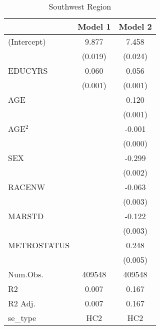 \documentclass[12pt, English]{article}
\begin{document}
\begin{table}
\centering %
    \caption{Southwest Region}
    \vspace{7.5mm} %
\begin{tabular}[t]{lcc}
\toprule
& Model 1 & Model 2\\
\midrule
(Intercept) & 9.877 & 7.458\\
 & (0.019) & (0.024)\\
EDUCYRS & 0.060 & 0.056\\
 & (0.001) & (0.001)\\
AGE &  & 0.120\\
 &  & (0.001)\\
AGE$^2$ &  & -0.001\\
 &  & (0.000)\\
SEX &  & -0.299\\
 &  & (0.002)\\
RACENW &  & -0.063\\
 &  & \vphantom{1} (0.003)\\
MARSTD &  & -0.122\\
 &  & (0.003)\\
METROSTATUS &  & 0.248\\
 &  & (0.005)\\
\midrule
Num.Obs. & 409548 & 409548\\
R2 & 0.007 & 0.167\\
R2 Adj. & 0.007 & 0.167\\
se\_type & HC2 & HC2\\
\bottomrule
\end{tabular}
\end{table}

\newpage
\end{document}
